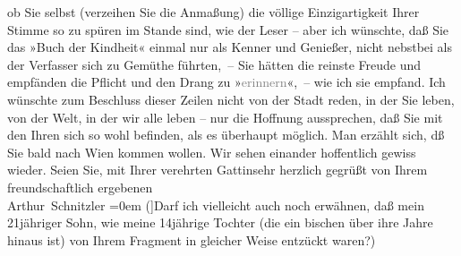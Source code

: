 \begin{ledgroupsized}[t]{13cm}
                    ob Sie selbst (verzeihen Sie die Anmaßung) die völlige Einzigartigkeit Ihrer
                    Stimme so zu spüren im Stande sind, wie der Leser – aber ich wünschte, daß Sie
                    das »Buch der Kindheit« einmal nur als Kenner und Genießer, nicht nebstbei als
                    der Verfasser sich zu Gemüthe führten, – Sie hätten die reinste Freude und
                    empfänden die Pflicht und den Drang zu »\textcolor{gray}{erinnern}«, – wie ich
                    sie empfand.\pend
           \pstart
           Ich wünschte zum Beschluss dieser Zeilen {\pb}nicht von der Stadt
                    reden, in der Sie leben, von der Welt, in der wir alle leben – nur die Hoffnung
                    aussprechen, daß Sie mit den Ihren sich so wohl befinden, als es überhaupt
                    möglich. Man erzählt sich, dß Sie bald nach Wien
                    kommen wollen. Wir sehen einander hoffentlich gewiss wieder.\pend
           \pstart
           Seien Sie, mit Ihrer verehrten Gattinsehr herzlich gegrüßt von Ihrem{\\[\baselineskip]}freundschaftlich ergebenen{\\[\baselineskip]}\spacefill\mbox{Arthur Schnitzler}\pend
           \leftskip=0em{}\pstart
           \noindent{}{[}({]}Darf ich vielleicht auch noch erwähnen, daß mein
                        21jähriger Sohn, wie
                        meine 14jährige Tochter
                        (die ein bischen über ihre Jahre hinaus ist) von Ihrem Fragment in gleicher Weise entzückt
                        waren?) \pend
           
         
         \endnumbering{}\end{ledgroupsized}  \newcommand{\dateiname}{L02404}\newcommand{\titel}{Arthur Schnitzler an Thomas Mann, 18. 11. 1923}\newcommand{\editorInnen}{Martin Anton Müller und Gerd-Hermann Susen}
      